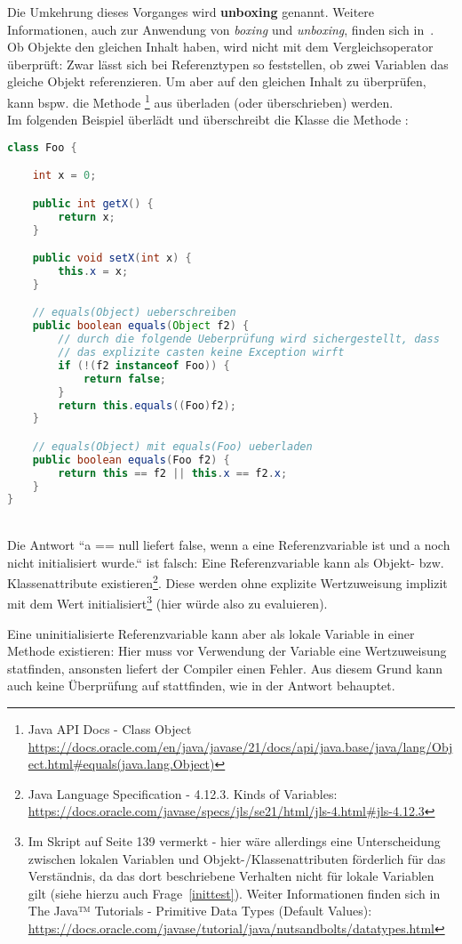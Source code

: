 Die Umkehrung dieses Vorganges wird \textbf{unboxing} genannt. Weitere Informationen, auch zur Anwendung
von \textit{boxing} und \textit{unboxing}, finden sich in~\cite[732 ff]{Ull12}.\\

Ob Objekte den gleichen Inhalt haben, wird nicht mit dem Vergleichsoperator \code{==} überprüft: Zwar lässt sich bei Referenztypen
so feststellen, ob zwei Variablen das gleiche Objekt referenzieren.
Um aber auf den gleichen Inhalt zu überprüfen, kann bspw. die Methode \footnote{
    Java API Docs - Class Object \url{https://docs.oracle.com/en/java/javase/21/docs/api/java.base/java/lang/Object.html#equals(java.lang.Object)}
} aus  überladen (oder überschrieben) werden.\\

Im folgenden Beispiel überlädt und überschreibt die Klasse  die Methode :

\begin{lstlisting}[language=java]
class Foo {

    int x = 0;

    public int getX() {
        return x;
    }

    public void setX(int x) {
        this.x = x;
    }

    // equals(Object) ueberschreiben
    public boolean equals(Object f2) {
        // durch die folgende Ueberprüfung wird sichergestellt, dass
        // das explizite casten keine Exception wirft
        if (!(f2 instanceof Foo)) {
            return false;
        }
        return this.equals((Foo)f2);
    }

    // equals(Object) mit equals(Foo) ueberladen
    public boolean equals(Foo f2) {
        return this == f2 || this.x == f2.x;
    }
}
\end{lstlisting}\\

Die Antwort ``a == null liefert false, wenn a eine Referenzvariable ist und a noch nicht initialisiert wurde.`` ist falsch:
Eine Referenzvariable kann als Objekt- bzw. Klassenattribute existieren\footnote{
    Java Language Specification - 4.12.3. Kinds of Variables: \url{https://docs.oracle.com/javase/specs/jls/se21/html/jls-4.html#jls-4.12.3}
}.
Diese werden ohne explizite Wertzuweisung implizit mit dem Wert  initialisiert\footnote{
    Im Skript auf Seite 139 vermerkt - hier wäre allerdings eine Unterscheidung zwischen lokalen Variablen und Objekt-/Klassenattributen
    förderlich für das Verständnis, da das dort beschriebene Verhalten nicht für lokale Variablen gilt (siehe hierzu auch Frage~\ref{inittest}).
    Weiter Informationen finden sich in The Java™ Tutorials - Primitive Data Types (Default Values): \url{https://docs.oracle.com/javase/tutorial/java/nutsandbolts/datatypes.html}
} (hier würde  also zu  evaluieren).

Eine uninitialisierte Referenzvariable kann aber als lokale Variable in einer Methode existieren: Hier muss vor Verwendung
der Variable eine Wertzuweisung statfinden, ansonsten liefert der Compiler einen Fehler.
Aus diesem Grund kann auch keine Überprüfung auf  stattfinden, wie in der Antwort behauptet.

